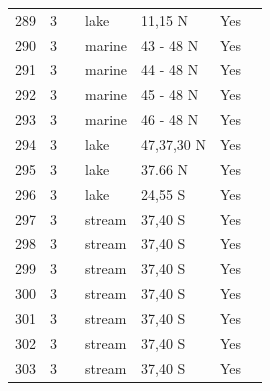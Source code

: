 \documentclass[12pt]{article}
\begin{document}
\begin{landscape}
\begin{table}[h!]
{\begin{tabular}{p{2.8cm}p{1.3cm}p{5.5cm}p{2.2cm}p{2.5cm}lp{3.5cm}}
        289   & 3 & \cite{Fetahi2011}  & lake  & 11,15 N & Yes   &       \\
        290   & 3 & \cite{Brodeur1992}    & marine & 43 - 48 N & Yes   &       \\
        291   & 3 & \cite{Brodeur1992}    & marine & 44 - 48 N & Yes   &       \\
        292   & 3 & \cite{Brodeur1992}    & marine & 45 - 48 N & Yes   &       \\
        293   & 3 & \cite{Brodeur1992}    & marine & 46 - 48 N & Yes   &       \\
        294   & 3 & \cite{Gaedke1994}  & lake  & 47,37,30 N & Yes   &       \\
        295   & 3 & \cite{Preston2012}    & lake  & 37.66 N & Yes   &        \\
        296   & 3 & \cite{Ratsirarson1996}  & lake  & 24,55 S & Yes   &       \\
        297   & 3 & \cite{Closs1994}  & stream & 37,40 S & Yes   &       \\
        298   & 3 & \cite{Closs1994}  & stream & 37,40 S & Yes   &       \\
        299   & 3 & \cite{Closs1994}  & stream & 37,40 S & Yes   &       \\
        300   & 3 & \cite{Closs1994}  & stream & 37,40 S & Yes   &       \\
        301   & 3 & \cite{Closs1994}  & stream & 37,40 S & Yes   &       \\
        302   & 3 & \cite{Closs1994}  & stream & 37,40 S & Yes   &       \\
        303   & 3 & \cite{Closs1994}  & stream & 37,40 S & Yes   &       \\
         \hline
      \end{tabular}}%
      \end{table}

        \newpage


\end{landscape}
\end{document}
